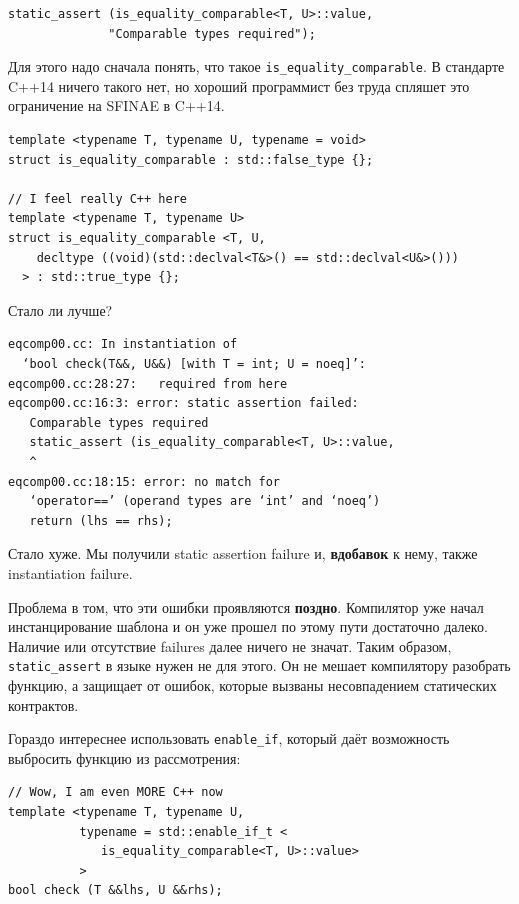 \documentclass[a4paper,12pt,oneside]{article}
\begin{document}
\begin{lstlisting}
static_assert (is_equality_comparable<T, U>::value, 
              "Comparable types required");
\end{lstlisting}

Для этого надо сначала понять, что такое \lstinline!is_equality_comparable!. В стандарте C++14 ничего такого нет, но хороший программист без труда спляшет это ограничение на SFINAE в C++14.

\begin{lstlisting}
template <typename T, typename U, typename = void>
struct is_equality_comparable : std::false_type {};

// I feel really C++ here
template <typename T, typename U>
struct is_equality_comparable <T, U,
    decltype ((void)(std::declval<T&>() == std::declval<U&>()))
  > : std::true_type {};
\end{lstlisting}

Стало ли лучше?

\begin{verbatim}
eqcomp00.cc: In instantiation of 
  ‘bool check(T&&, U&&) [with T = int; U = noeq]’:
eqcomp00.cc:28:27:   required from here
eqcomp00.cc:16:3: error: static assertion failed: 
   Comparable types required
   static_assert (is_equality_comparable<T, U>::value, 
   ^
eqcomp00.cc:18:15: error: no match for 
   ‘operator==’ (operand types are ‘int’ and ‘noeq’)
   return (lhs == rhs);
\end{verbatim}

Стало хуже. Мы получили static assertion failure и, \textbf{вдобавок} к нему, также instantiation failure.

Проблема в том, что эти ошибки проявляются \textbf{поздно}. Компилятор уже начал инстанцирование шаблона и он уже прошел по этому пути достаточно далеко. Наличие или отсутствие failures далее ничего не значат. Таким образом, \lstinline!static_assert! в языке нужен не для этого. Он не мешает компилятору разобрать функцию, а защищает от ошибок, которые вызваны несовпадением статических контрактов.

Гораздо интереснее использовать \lstinline!enable_if!, который даёт возможность выбросить функцию из рассмотрения:

\begin{lstlisting}
// Wow, I am even MORE C++ now
template <typename T, typename U,
          typename = std::enable_if_t <
             is_equality_comparable<T, U>::value>
          >
bool check (T &&lhs, U &&rhs);
\end{lstlisting}
\end{document}
